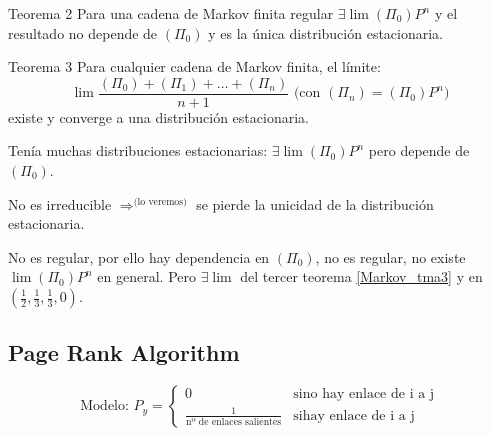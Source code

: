 \begin{theorem}{Teorema 2}
	\label{Markov_tma2}
	Para una cadena de Markov finita regular $\exists \lim (\Pi_0) P^n$ y el resultado no depende de $(\Pi_0)$ y es la única distribución estacionaria.
\end{theorem}

\begin{theorem}{Teorema 3}
	\label{Markov_tma3}
	Para cualquier cadena de Markov finita, el límite:
	\[\lim \frac{(\Pi_0)+(\Pi_1)+…+(\Pi_n)}{n+1}  \text{ (con }(\Pi_n) = (\Pi_0)P^n\text{)}\]
	existe y converge a una distribución estacionaria.
\end{theorem}


\begin{example}

\begin{figure}[hbtp]
	\centering
\end{figure}

Tenía muchas distribuciones estacionarias: $\exists \lim(\Pi_0)P^n$ pero depende de $(\Pi_0)$.

No es irreducible $\Rightarrow^{\text{(lo veremos)}}$ se pierde la unicidad de la distribución estacionaria.

\end{example}

\begin{example}

\begin{figure}[h!btp]
	\centering
\end{figure}

No es regular, por ello hay dependencia en $(\Pi_0)$, no es regular, no existe $\lim(\Pi_0) P^n$ en general. Pero $\exists \lim$ del tercer teorema \ref{Markov_tma3} y en $(\frac{1}{2},\frac{1}{3},\frac{1}{3},0)$.

\end{example}


\subsection{Page Rank Algorithm}

\begin{figure}[hbtp]
	\centering
\end{figure}


$$\text{Modelo: } P_y = \left\{
	\begin{array}{ll}
		0  & \mbox{si} \text{no hay enlace de i a j} \\
		\frac{1}{\text{nº de enlaces salientes}} & \mbox{si} \text{hay enlace de i a j}
	\end{array}
\right.
$$

